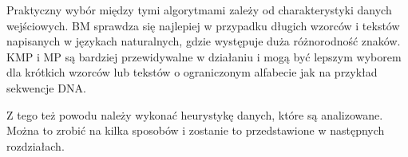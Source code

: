 Praktyczny wybór między tymi algorytmami zależy od charakterystyki danych
wejściowych. BM sprawdza się najlepiej w przypadku długich wzorców i tekstów
napisanych w językach naturalnych, gdzie występuje duża różnorodność znaków.
KMP i MP są bardziej przewidywalne w działaniu i mogą być lepszym wyborem dla 
krótkich wzorców lub tekstów o ograniczonym alfabecie jak na przykład sekwencje
DNA.

Z tego też powodu należy wykonać heurystykę danych, które są analizowane.
Można to zrobić na kilka sposobów i zostanie to przedstawione w następnych rozdziałach.

